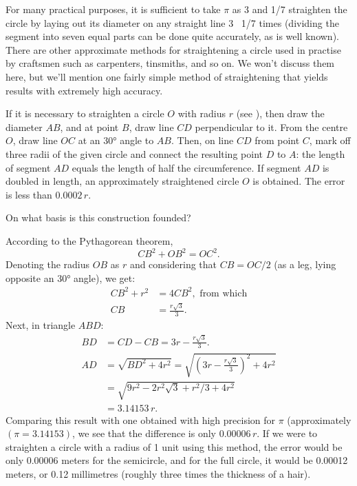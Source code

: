 For many practical purposes, it is sufficient to take $\pi$ as 3 and  1/7 straighten the circle by laying out its diameter on any straight line 3 \, 1/7 times (dividing the segment into seven equal parts can be done quite accurately, as is well known). There are other approximate methods for straightening a circle used in practise by craftsmen such as carpenters, tinsmiths, and so on. We won't discuss them here, but we'll mention one fairly simple method of straightening that yields results with extremely high accuracy.



If it is necessary to straighten a circle $O$ with radius $r$ (see ), then draw the diameter $AB$, and at point $B$, draw line $CD$ perpendicular to it. From the centre $O$, draw line $OC$ at an \ang{30} angle to $AB$. Then, on line $CD$ from point $C$, mark off three radii of the given circle and connect the resulting point $D$ to $A$: the length of segment $AD$ equals the length of half the circumference. If segment $AD$ is doubled in length, an approximately straightened circle $O$ is obtained. The error is less than $0.0002\, r$.

On what basis is this construction founded?

\ans According to the Pythagorean theorem, 
\begin{equation*}%
CB^{2} + OB^{2} = OC^{2}.
\end{equation*}
Denoting the radius $OB$ as $r$ and considering that $CB = OC/2$ (as a leg, lying opposite an \ang{30} angle), we get: 
\begin{align*}%
CB^{2} + r^{2}  & = 4CB^{2}, \,\, \text{from which}\\
CB & = \frac{r \sqrt{3}}{3}.
\end{align*}
Next, in triangle $ABD$:
\begin{align*}%
BD & =  CD - CB = 3r - \frac{r\sqrt{3}}{3}.\\
AD & = \sqrt{BD^{2} + 4r^{2}} = \sqrt{\left( 3r - \frac{r \sqrt{3}}{3} \right)^{2} + 4r^{2}} \\
& = \sqrt{9r^{2} - 2r^{2}\sqrt{3} + r^{2}/3 + 4r^{2}} \\
& = 3.14153\, r.
\end{align*}
Comparing this result with one obtained with high precision for $\pi$ (approximately $( \pi = 3.14153)$, we see that the difference is only $0.00006\, r$. If we were to straighten a circle with a radius of 1 unit using this method, the error would be only 0.00006 meters for the semicircle, and for the full circle, it would be 0.00012 meters, or 0.12 millimetres (roughly three times the thickness of a hair).


